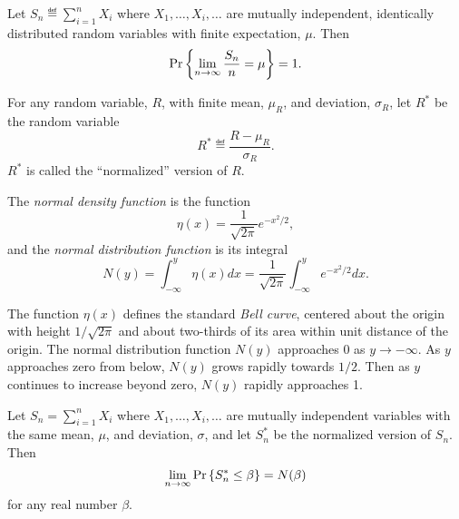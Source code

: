 \documentclass[11pt]{article}
\begin{document}
\begin{theorem*}
Let $S_n \eqdef \sum_{i=1}^n X_i$ where $X_1, \dots, X_i, \dots$ are
mutually independent, identically distributed random variables with finite
expectation, $\mu$.  Then
\[
\mathop{\textup{Pr}}\nolimits\left\{\lim_{n\to\infty}\frac{S_n}{n} = \mu\right\} =1.
\]
\end{theorem*}

\begin{definition*}
For any random variable, $R$, with finite mean, $\mu_R$, and
deviation, $\sigma_R$, let $R^*$ be the random variable
\[
R^* \eqdef \frac{R-\mu_R}{\sigma_R}.
\]
$R^*$ is called the ``normalized'' version of $R$.
\end{definition*}

\begin{definition*}
The \emph{normal density function} is the function 
\[
\eta(x) = \frac{1}{\sqrt{2\pi}}e^{-x^2/2},
\]
and the \emph{normal distribution function} is its integral
\[
N(y) = \int_{-\infty}^y \eta(x)dx = \frac{1}{\sqrt{2\pi}}\int_{-\infty}^y
e^{-x^2/2}dx.
\]
\end{definition*}

The function $\eta(x)$ defines the standard \emph{Bell curve}, centered about
the origin with height $1/\sqrt{2\pi}$ and about two-thirds of its area
within unit distance of the origin.  The normal distribution function
$N(y)$ approaches 0 as $y \rightarrow -\infty$.  As $y$ approaches zero
from below, $N(y)$ grows rapidly towards $1/2$.  Then as $y$ continues to
increase beyond zero, $N(y)$ rapidly approaches 1.

\begin{theorem*}
Let $S_n = \sum_{i=1}^n X_i$ where $X_1, \dots, X_i, \dots$ are
mutually independent variables with the same mean, $\mu$, and deviation,
$\sigma$, and let $S^*_n$ be the normalized version of $S_n$.  Then
\begin{equation}\label{normal}
\lim_{n\rightarrow\infty} \mathop{\textup{Pr}}\nolimits\left\{S^*_n \leq \beta\right\}= N(\beta)
\end{equation}
for any real number $\beta$.
\end{theorem*}
\end{document}

